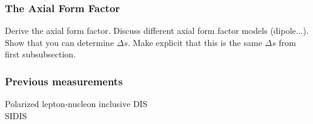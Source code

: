   \subsubsection{The Axial Form Factor}
    Derive the axial form factor. Discuss different axial form factor models
    (dipole...). Show that you can determine $\Delta s$. Make explicit that
    this is the same $\Delta s$ from first subsubsection.
  \subsubsection{Previous measurements}
    Polarized lepton-nucleon inclusive DIS \\
    SIDIS
    

